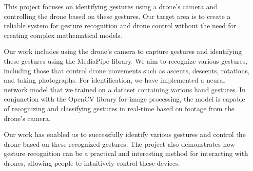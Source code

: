 This project focuses on identifying gestures using a drone's camera and controlling the drone based on these gestures. Our target area is to create a reliable system for gesture recognition and drone control without the need for creating complex mathematical models.

Our work includes using the drone's camera to capture gestures and identifying these gestures using the MediaPipe library. We aim to recognize various gestures, including those that control drone movements such as ascents, descents, rotations, and taking photographs. For identification, we have implemented a neural network model that we trained on a dataset containing various hand gestures. In conjunction with the OpenCV library for image processing, the model is capable of recognizing and classifying gestures in real-time based on footage from the drone's camera.

Our work has enabled us to successfully identify various gestures and control the drone based on these recognized gestures. The project also demonstrates how gesture recognition can be a practical and interesting method for interacting with drones, allowing people to intuitively control these devices.